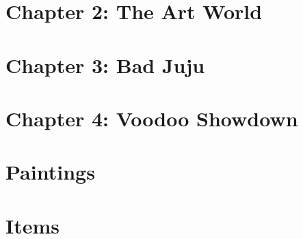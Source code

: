 \documentclass{article}
\begin{document}
\section{Chapter 2: The Art World}
\section{Chapter 3: Bad Juju}
\section{Chapter 4: Voodoo Showdown}
\section{Paintings}
\section{Items}
\end{document}
